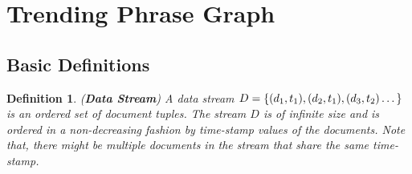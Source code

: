 \documentclass{sig-alternate}
\newtheorem{definition}{Definition}[section]
\begin{document}
\section{Trending Phrase Graph}
\label{sec:trending-phrase-graphs}

%


\subsection{Basic Definitions}

\begin{definition}
(\textbf{Data Stream}) A data stream $D = \{(d_1,\\ t_1), (d_2, t_1), (d_3, t_2) \dots \}$ is an ordered set of document tuples. The stream $D$ is of infinite size and is ordered in a non-decreasing fashion by time-stamp values of the documents. Note that, there might be multiple documents in the stream that share the same time-stamp.
\end{definition}
\end{document}
